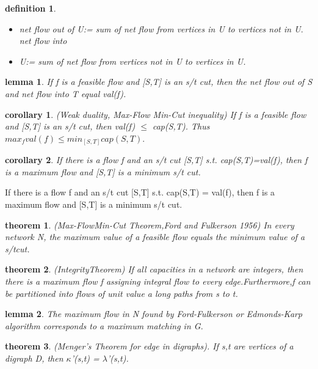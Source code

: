 \documentclass[twocolumn]{article}
\newtheorem{theorem}{theorem}[section]  %
\newtheorem{definition}{definition}
\newtheorem{lemma}{lemma}
\newtheorem{corollary}{corollary}
\begin{document}
\begin{CJK*}{UTF8}{bkai}
    \begin{definition}
        \begin{itemize}
            \item net flow out of U:= sum of net flow from vertices in U to vertices not in U.
 net flow into 
\item U:= sum of net flow from vertices not in U to vertices in U.
        \end{itemize}
    \end{definition}

    \begin{lemma}
         If f is a feasible flow and [S,T] is an s/t cut, then the net flow out of S and
 net flow into T equal val(f).
    \end{lemma}

    \begin{corollary}{(Weak duality, Max-Flow Min-Cut inequality)}
       If f is a feasible flow and [S,T] is an s/t cut, then val(f) $\leq$ cap(S,T). Thus
 $max_{f}  val(f) \leq min_{[S,T]} cap(S,T).$ 
    \end{corollary}

    \begin{corollary}
         If there is a flow f and an s/t cut [S,T] s.t. cap(S,T)=val(f), then f is a
 maximum flow and [S,T] is a minimum s/t cut.
    \end{corollary}
     If there is a flow f and an s/t cut [S,T] s.t. cap(S,T) = val(f), then f is a
 maximum flow and [S,T] is a minimum s/t cut.
    \begin{theorem}{(Max-FlowMin-Cut Theorem,Ford and
 Fulkerson 1956)}
         In every network N, the maximum value of a feasible flow equals the minimum
 value of a s/tcut.
    \end{theorem}

    \begin{theorem}{(IntegrityTheorem)}
        If all capacities in a network are integers, then there is a maximum flow f
 assigning integral flow to every edge.Furthermore,f can be partitioned into
 flows of unit value a long paths from s to t.
    \end{theorem}

    \begin{lemma}
         The maximum flow in N found by Ford-Fulkerson or Edmonds-Karp
 algorithm corresponds to a maximum matching in G.
    \end{lemma}

    \begin{theorem}{(Menger's Theorem for edge in digraphs).}
        If s,t are vertices of a digraph D, then $\kappa$'(s,t) = $\lambda$'(s,t).
    \end{theorem}


\end{CJK*}
\end{document}
